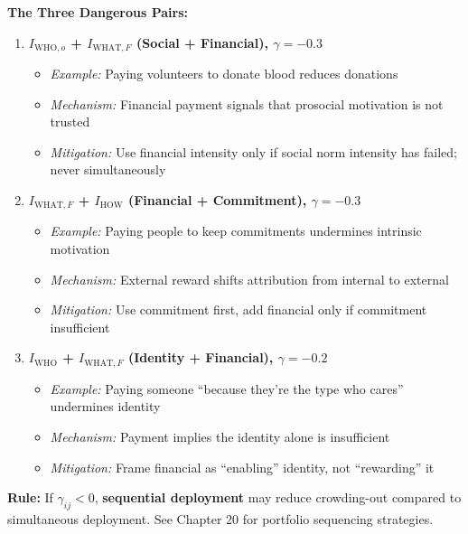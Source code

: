 \begin{tcolorbox}[colback=red!5!white, colframe=red!75!black,
    title=\textbf{Critical Crowding-Out Combinations (NEVER combine without mitigation)}]

\textbf{The Three Dangerous Pairs:}

\begin{enumerate}
    \item \textbf{$I_{\text{WHO},o}$ + $I_{\text{WHAT},F}$ (Social + Financial), $\gamma = -0.3$}
    \begin{itemize}[nosep]
        \item \textit{Example:} Paying volunteers to donate blood reduces donations \citep{gneezy2000fine}
        \item \textit{Mechanism:} Financial payment signals that prosocial motivation is not trusted
        \item \textit{Mitigation:} Use financial intensity only if social norm intensity has failed; never simultaneously
    \end{itemize}

    \item \textbf{$I_{\text{WHAT},F}$ + $I_{\text{HOW}}$ (Financial + Commitment), $\gamma = -0.3$}
    \begin{itemize}[nosep]
        \item \textit{Example:} Paying people to keep commitments undermines intrinsic motivation
        \item \textit{Mechanism:} External reward shifts attribution from internal to external
        \item \textit{Mitigation:} Use commitment first, add financial only if commitment insufficient
    \end{itemize}

    \item \textbf{$I_{\text{WHO}}$ + $I_{\text{WHAT},F}$ (Identity + Financial), $\gamma = -0.2$}
    \begin{itemize}[nosep]
        \item \textit{Example:} Paying someone ``because they're the type who cares'' undermines identity
        \item \textit{Mechanism:} Payment implies the identity alone is insufficient
        \item \textit{Mitigation:} Frame financial as ``enabling'' identity, not ``rewarding'' it
    \end{itemize}
\end{enumerate}

\textbf{Rule:} If $\gamma_{ij} < 0$, \textbf{sequential deployment} may reduce crowding-out compared to simultaneous deployment. See Chapter 20 for portfolio sequencing strategies.

\end{tcolorbox}

